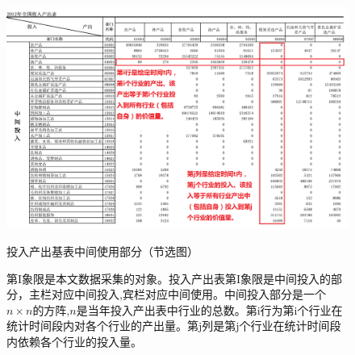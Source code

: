 \documentclass{sysuthesis}
\begin{document}
  \begin{figure}[h!tbp]
  \centering
  \includegraphics[scale=0.6]{image/2012-流量表中间投入部分.png}
  \caption{投入产出基表中间使用部分（节选图）}
  \caption*{\footnotesize 第I象限是本文数据采集的对象。投入产出表第I象限是中间投入的部分，主栏对应中间投入,宾栏对应中间使用。中间投入部分是一个$n \times n$的方阵,$n$是当年投入产出表中行业的总数。第i行为第i个行业在统计时间段内对各个行业的产出量。第j列是第j个行业在统计时间段内依赖各个行业的投入量。}
  \label{fig:ioaccount-quardone}
  \end{figure}
\end{document}
